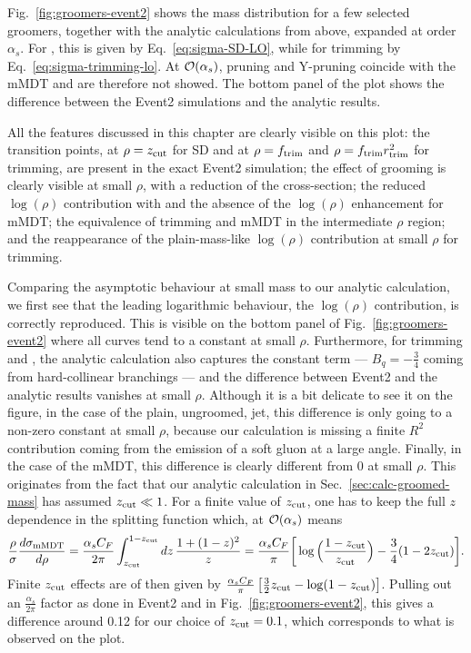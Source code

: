Fig.~\ref{fig:groomers-event2} shows the mass distribution for a few
selected groomers, together with the analytic calculations from above,
expanded at order $\alpha_s$. For \SD, this is given by
Eq.~\eqref{eq:sigma-SD-LO}, while for trimming by
Eq.~\eqref{eq:sigma-trimming-lo}. At ${\cal {O}}(\alpha_s)$, pruning
and Y-pruning coincide with the mMDT and are therefore not showed.
%
The bottom panel of the plot shows the difference between the Event2
simulations and the analytic results.

All the features discussed in this chapter are clearly visible on this
plot: the transition points, at $\rho=z_{\text{cut}}$ for
SD and at $\rho=f_{\text{trim}}$ and $\rho=f_{\text{trim}}r_{\text{trim}}^2$ for trimming,
are present in the exact Event2 simulation; the effect of grooming
is clearly visible at small $\rho$, with a reduction of the
cross-section; the reduced $\log(\rho)$ contribution with \SD and
the absence of the $\log(\rho)$ enhancement for mMDT; the equivalence of
trimming and mMDT in the intermediate $\rho$ region; and the
reappearance of the plain-mass-like $\log(\rho)$ contribution at small
$\rho$ for trimming.

Comparing the asymptotic behaviour at small mass to our
analytic calculation, we first see that the leading logarithmic
behaviour, \ie the $\log(\rho)$ contribution, is correctly
reproduced. This is visible on the bottom panel of
Fig.~\ref{fig:groomers-event2} where all curves tend to a constant at
small $\rho$.
%
Furthermore, for trimming and \SD, the analytic calculation also
captures the constant term --- $B_q=-\tfrac{3}{4}$ coming from
hard-collinear branchings --- and the difference between Event2 and the
analytic results vanishes at small $\rho$.
%
Although it is a bit delicate to see it on the figure, in the case of the
plain, ungroomed, jet, this difference is  only going to a non-zero
constant at small $\rho$, because our calculation is missing a finite
$R^2$ contribution coming from the emission of a soft gluon at a large
angle.
%
Finally, in the case of the mMDT, this difference is clearly different from 0 at small
$\rho$. This originates from the fact that our analytic calculation in
Sec.~\ref{sec:calc-groomed-mass} has assumed $z_{\text{cut}}\ll 1$. For a
finite value of $z_{\text{cut}}$, one has to keep the full $z$ dependence in
the splitting function which, at ${\cal{O}}(\alpha_s)$ means
\begin{equation}
  \frac{\rho}{\sigma}\frac{d\sigma_{\text{mMDT}}}{d\rho}
   =
   \frac{\alpha_sC_F}{2\pi}\int_{z_{\text{cut}}}^{1-z_{\text{cut}}}dz\,\frac{1+(1-z)^2}{z}
   = \frac{\alpha_sC_F}{\pi}\bigg[\log\Big(\frac{1-z_{\text{cut}}}{z_{\text{cut}}}\Big)-\frac{3}{4}(1-2z_{\text{cut}})\bigg].
\end{equation}
Finite $z_{\text{cut}}$ effects are of then given by
$\tfrac{\alpha_sC_F}{\pi}\left[ \tfrac{3}{2}z_{\text{cut}}-\log(1-z_{\text{cut}})\right]$. Pulling out
an $\tfrac{\alpha_s}{2\pi}$ factor as done in Event2 and in
Fig.~\ref{fig:groomers-event2}, this gives a difference around 0.12
for our choice of $z_{\text{cut}}=0.1$, which corresponds to what is observed
on the plot.
  
